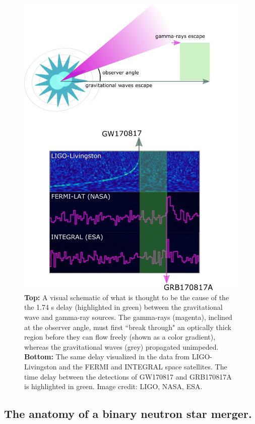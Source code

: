 \documentclass[1.5,11pt]{beavtex}
\begin{document}
\begin{figure}[htbp]
  \centering
  \includegraphics[scale=0.55]{images/ch1/time-delay-2.png}
  \caption{\selectfont \textbf{Top:} A visual schematic of what is thought to be the cause of the the 1.74 s delay (highlighted in green) between the gravitational wave and gamma-ray sources. The gamma-rays (magenta), inclined at the observer angle, must first ``break through" an optically thick region before they can flow freely (shown as a color gradient), whereas the gravitational waves (grey) propagated unimpeded. \textbf{Bottom:} The same delay visualized in the data from LIGO-Livingston and the FERMI and INTEGRAL space satellites. The time delay between the detections of GW170817 and GRB170817A is highlighted in green. Image credit: LIGO, NASA, ESA.}
  \label{fig:time-delay}
\end{figure}

\clearpage
\subsection{The anatomy of a binary neutron star merger.}
\label{ch:Intro ssec: a BNS merger}
\end{document}
